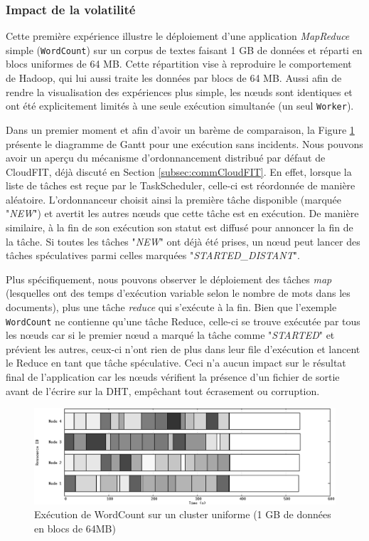 \subsubsection{Impact de la volatilité}

Cette première expérience illustre le déploiement d'une application \textit{MapReduce} simple (\texttt{WordCount}) sur un corpus de textes faisant 1 GB de données et réparti en blocs uniformes de 64 MB. Cette répartition vise à reproduire le comportement de Hadoop, qui lui aussi traite les données par blocs de 64 MB.  Aussi afin de rendre la visualisation des expériences plus simple, les n{\oe}uds sont identiques et ont été explicitement limités à une seule exécution simultanée (un seul \texttt{Worker}). 

Dans un premier moment et afin d'avoir un barème de comparaison, la Figure \ref{fig:regular} présente le diagramme de Gantt pour une exécution sans incidents.
Nous pouvons avoir un aperçu du mécanisme d'ordonnancement distribué par défaut de CloudFIT, déjà discuté en Section \ref{subsec:commCloudFIT}. En effet, lorsque la liste de tâches est reçue par le TaskScheduler, celle-ci est réordonnée de manière aléatoire. L'ordonnanceur choisit ainsi la première tâche disponible (marquée "\textit{NEW}") et avertit les autres n{\oe}uds que cette tâche est en exécution. De manière similaire, à la fin de son exécution son statut est diffusé pour annoncer la fin de la tâche. Si toutes les tâches "\textit{NEW}" ont déjà été prises, un n{\oe}ud peut lancer des tâches spéculatives parmi celles marquées "\textit{STARTED\_DISTANT}". 

Plus spécifiquement, nous pouvons observer le déploiement des tâches \textit{map} (lesquelles ont des temps d'exécution variable selon le nombre de mots dans les documents), plus une tâche \textit{reduce} qui s'exécute à la fin. Bien que l'exemple \texttt{WordCount} ne contienne qu'une tâche Reduce, celle-ci se trouve exécutée par tous les n{\oe}uds car si le premier n{\oe}ud a marqué la tâche comme "\textit{STARTED}" et prévient les autres, ceux-ci n'ont rien de plus dans leur file d'exécution et lancent le Reduce en tant que tâche spéculative. Ceci n'a aucun impact sur le résultat final de l'application car les n{\oe}uds vérifient la présence d'un fichier de sortie avant de l'écrire sur la DHT, empêchant tout écrasement ou corruption. 

\begin{figure}
	\centering
		\includegraphics[width=1\linewidth]{img/regular2}
		\caption{Exécution de WordCount sur un cluster uniforme (1 GB de données en blocs de 64MB)}\label{fig:regular}
\end{figure}




